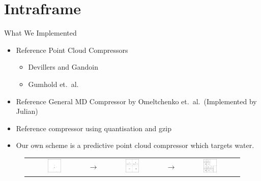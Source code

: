 \documentclass{beamer}
\begin{document}
\section{Intraframe}
\begin{frame}{What We Implemented}
  \begin{itemize}
    \item Reference Point Cloud Compressors
      \begin{itemize}
        \item Devillers and Gandoin
        \item Gumhold et.~al.
      \end{itemize}
    \item Reference General MD Compressor by Omeltchenko et.~al.~(Implemented
      by Julian)
    \item Reference compressor using quantisation and gzip
    \item Our own scheme is a predictive point cloud compressor which targets
      water.
  \end{itemize}
  \begin{figure}[h]
    \centering 
    \begin{tabular}{ccccc}
        \includegraphics[width=0.25\textwidth]{keegan-images/dg1}
      & $\to$
      & \includegraphics[width=0.25\textwidth]{keegan-images/dg2}
      & $\to$
      & \includegraphics[width=0.25\textwidth]{keegan-images/dg3}
    \end{tabular}
  \end{figure}
\end{frame}
\end{document}

